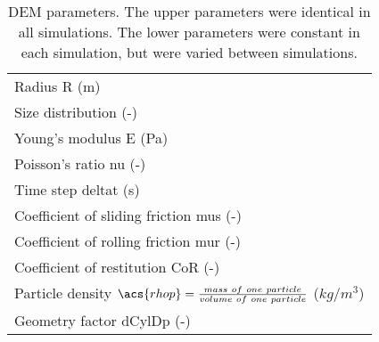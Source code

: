 \begin{table}[h]
\centering
\begin{tabular}{l}
\hline 
    Radius \acs{R} (m)   \\ [5pt]

	Size distribution (-) \\ [5pt]

    Young's modulus \acs{E} (Pa)  \\ [5pt]

    Poisson's ratio \acs{nu} (-) \\ 
     Time step \acs{deltat} (s) \\ [5pt]
        \hline
     Coefficient of sliding friction \acs{mus} (-)\\  [5pt]
    Coefficient of rolling friction \acs{mur} (-) \\ [5pt]
    Coefficient of restitution \acs{CoR} (-)   \\ [5pt]
     Particle density $\acs{rhop} = \frac{mass ~ of ~ one ~ particle}{volume ~ of
     ~ one ~ particle}$ ($kg/m^3$)  \\ [5pt]
     Geometry factor \acs{dCylDp} (-)  \\ [5pt]
   
\hline
\end{tabular}
\caption[DEM parameters]{DEM parameters. The upper parameters were
identical in all simulations. The lower parameters were constant in each
simulation, but were varied between simulations.}
\label{tab:08DEMparameters}
\end{table}

